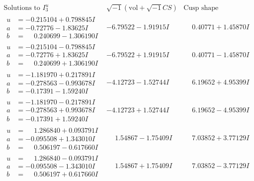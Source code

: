 \documentclass[1p]{elsarticle_modified}
\theoremstyle{definition}
\newcommand{\I}{\sqrt{-1}}
\begin{document}
$$\begin{array}{c|c|c}  
\text{Solutions to }I^u_{3}& \I (\text{vol} + \sqrt{-1}CS) & \text{Cusp shape}\\
 \hline 
\begin{aligned}
u &= -0.215104 + 0.798845 I \\
a &= -0.72776 - 1.83625 I \\
b &= \phantom{-}0.240699 - 1.306190 I\end{aligned}
 & -6.79522 - 1.91915 I & \phantom{-}0.40771 + 1.45870 I \\ \hline\begin{aligned}
u &= -0.215104 - 0.798845 I \\
a &= -0.72776 + 1.83625 I \\
b &= \phantom{-}0.240699 + 1.306190 I\end{aligned}
 & -6.79522 + 1.91915 I & \phantom{-}0.40771 - 1.45870 I \\ \hline\begin{aligned}
u &= -1.181970 + 0.217891 I \\
a &= -0.278563 - 0.993678 I \\
b &= -0.17391 - 1.59240 I\end{aligned}
 & -4.12723 - 1.52744 I & \phantom{-}6.19652 + 4.95399 I \\ \hline\begin{aligned}
u &= -1.181970 - 0.217891 I \\
a &= -0.278563 + 0.993678 I \\
b &= -0.17391 + 1.59240 I\end{aligned}
 & -4.12723 + 1.52744 I & \phantom{-}6.19652 - 4.95399 I \\ \hline\begin{aligned}
u &= \phantom{-}1.286840 + 0.093791 I \\
a &= -0.095508 + 1.343010 I \\
b &= \phantom{-}0.506197 - 0.617660 I\end{aligned}
 & \phantom{-}1.54867 - 1.75409 I & \phantom{-}7.03852 + 3.77129 I \\ \hline\begin{aligned}
u &= \phantom{-}1.286840 - 0.093791 I \\
a &= -0.095508 - 1.343010 I \\
b &= \phantom{-}0.506197 + 0.617660 I\end{aligned}
 & \phantom{-}1.54867 + 1.75409 I & \phantom{-}7.03852 - 3.77129 I \\ \hline\begin{aligned}

\end{aligned}
\end{array}$$
\end{document}
